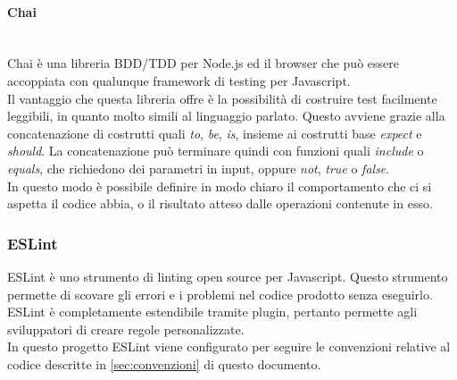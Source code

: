 \paragraph{Chai}\mbox{}\\
Chai è una libreria BDD/TDD per Node.js ed il browser che può essere accoppiata con qualunque framework di testing per Javascript.\\
Il vantaggio che questa libreria offre è la possibilità di costruire test facilmente leggibili, in quanto molto simili al linguaggio parlato. Questo avviene grazie alla concatenazione di costrutti quali \textit{to}, \textit{be}, \textit{is}, insieme ai costrutti base \textit{expect} e \textit{should}. La concatenazione può terminare quindi con funzioni quali \textit{include} o \textit{equals}, che richiedono dei parametri in input, oppure \textit{not}, \textit{true} o \textit{false}.\\
In questo modo è possibile definire in modo chiaro il comportamento che ci si aspetta il codice abbia, o il risultato atteso dalle operazioni contenute in esso.

\subsubsection{ESLint} \label{sec:eslint}
ESLint è uno strumento di linting open source per Javascript. Questo strumento permette di scovare gli errori e i problemi nel codice prodotto senza eseguirlo.\\ ESLint è completamente estendibile tramite plugin, pertanto permette agli sviluppatori di creare regole personalizzate.\\
In questo progetto ESLint viene configurato per seguire le convenzioni relative al codice descritte in \sezione \ref{sec:convenzioni} di questo documento.